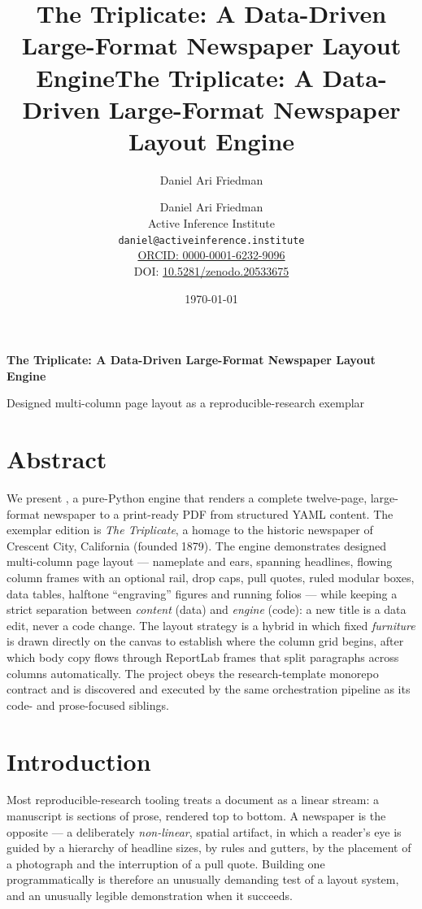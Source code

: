 \documentclass[
  english,
]{article}
\title{The Triplicate: A Data-Driven Large-Format Newspaper Layout
Engine}
\author{Daniel Ari Friedman}
\date{}
\title{The Triplicate: A Data-Driven Large-Format Newspaper Layout Engine}
\author{Daniel Ari Friedman\\\footnotesize{Active Inference Institute}\\\footnotesize{\texttt{daniel@activeinference.institute}}\\\footnotesize{\href{https://orcid.org/0000-0001-6232-9096}{ORCID: 0000-0001-6232-9096}} \\ \footnotesize{DOI: \href{https://doi.org/10.5281/zenodo.20533675}{10.5281/zenodo.20533675}}}
\date{\today}
\begin{document}
\begin{titlepage}
\centering
\vspace*{2cm}
{\LARGE\bfseries The Triplicate: A Data-Driven Large-Format Newspaper Layout Engine\par}
\vspace{0.75em}
{\large Designed multi-column page layout as a reproducible-research exemplar\par}
\vfill
\makeatletter
{\@author\par}
\vspace{1em}
{\@date\par}
\makeatother
\vfill
\end{titlepage}
\thispagestyle{empty}
\tableofcontents
\newpage

\section{Abstract}\label{abstract}

We present , a pure-Python engine that
renders a complete twelve-page, large-format newspaper to a print-ready
PDF from structured YAML content. The exemplar edition is \emph{The
Triplicate}, a homage to the historic newspaper of Crescent City,
California (founded 1879). The engine demonstrates designed multi-column
page layout --- nameplate and ears, spanning headlines, flowing column
frames with an optional rail, drop caps, pull quotes, ruled modular
boxes, data tables, halftone ``engraving'' figures and running folios
--- while keeping a strict separation between \emph{content} (data) and
\emph{engine} (code): a new title is a data edit, never a code change.
The layout strategy is a hybrid in which fixed \emph{furniture} is drawn
directly on the canvas to establish where the column grid begins, after
which body copy flows through ReportLab frames that split paragraphs
across columns automatically. The project obeys the research-template
monorepo contract and is discovered and executed by the same
orchestration pipeline as its code- and prose-focused siblings.

\newpage

\section{Introduction}\label{introduction}

Most reproducible-research tooling treats a document as a linear stream:
a manuscript is sections of prose, rendered top to bottom. A newspaper
is the opposite --- a deliberately \emph{non-linear}, spatial artifact,
in which a reader's eye is guided by a hierarchy of headline sizes, by
rules and gutters, by the placement of a photograph and the interruption
of a pull quote. Building one programmatically is therefore an unusually
demanding test of a layout system, and an unusually legible
demonstration when it succeeds.
\end{document}
